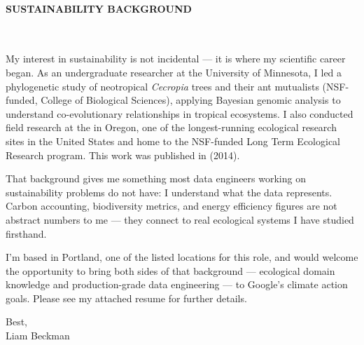 \paragraph{SUSTAINABILITY BACKGROUND}\

\vspace*{\baselineskip}

My interest in sustainability is not incidental --- it is where my scientific career began. As an undergraduate researcher at the University of Minnesota, I led a phylogenetic study of neotropical \emph{Cecropia} trees and their ant mutualists (NSF-funded, College of Biological Sciences), applying Bayesian genomic analysis to understand co-evolutionary relationships in tropical ecosystems. I also conducted field research at the  in Oregon, one of the longest-running ecological research sites in the United States and home to the NSF-funded Long Term Ecological Research program. This work was published in  (2014).

\vspace*{\baselineskip}

That background gives me something most data engineers working on sustainability problems do not have: I understand what the data represents. Carbon accounting, biodiversity metrics, and energy efficiency figures are not abstract numbers to me --- they connect to real ecological systems I have studied firsthand.

\vspace*{\baselineskip}

I'm based in Portland, one of the listed locations for this role, and would welcome the opportunity to bring both sides of that background --- ecological domain knowledge and production-grade data engineering --- to Google's climate action goals. Please see my attached resume for further details.

\vspace*{\baselineskip}

Best,\\

Liam Beckman

\vfill \myBreak{}



